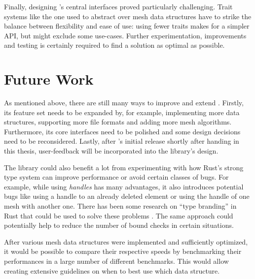 Finally, designing 's central interfaces proved particularly challenging.
Trait systems like the one used to abstract over mesh data structures have to strike the balance between flexibility and ease of use:
using fewer traits makes for a simpler API, but might exclude some use-cases.
Further experimentation, improvements and testing is certainly required to find a solution as optimal as possible.

\vspace{1cm}

\newpage
\section{Future Work}

As mentioned above, there are still many ways to improve and extend .
Firstly, its feature set needs to be expanded by, for example, implementing more data structures, supporting more file formats and adding more mesh algorithms.
Furthermore, its core interfaces need to be polished and some design decisions need to be reconsidered.
Lastly, after 's initial release shortly after handing in this thesis, user-feedback will be incorporated into the library's design.

The library could also benefit a lot from experimenting with how Rust's strong type system can improve performance or avoid certain classes of bugs.
For example, while using \emph{handles} has many advantages, it also introduces potential bugs like using a handle to an already deleted element or using the handle of one mesh with another one.
There has been some research on \enquote{type branding} in Rust that could be used to solve these problems \cite{beingessner2016you, indexing}.
The same approach could potentially help to reduce the number of bound checks in certain situations.

After various mesh data structures were implemented and sufficiently optimized, it would be possible to compare their respective speeds by benchmarking their performances in a large number of different benchmarks.
This would allow creating extensive guidelines on when to best use which data structure.



